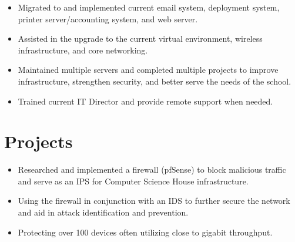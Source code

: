 \documentclass[]{deedy-resume-openfont}
\begin{document}
\begin{minipage}[t]{0.66\textwidth}
\vspace{-3mm}
\begin{itemize}
  \itemsep-4pt
  \item Migrated to and implemented current email system, deployment system, printer server/accounting system, and web server.
  \item Assisted in the upgrade to the current virtual environment, wireless infrastructure, and core networking.
  \item Maintained multiple servers and completed multiple projects to improve infrastructure, strengthen security, and better serve the needs of the school.
  \item Trained current IT Director and provide remote support when needed.
\end{itemize}
\vspace{-4mm}
\sectionsep

\sectionsep

\vspace{-3mm}
\section{Projects}
\vspace{-3mm}
\begin{itemize}
  \itemsep-4pt
  \item Researched and implemented a firewall (pfSense) to block malicious traffic and serve as an IPS for Computer Science House infrastructure.
  \item Using the firewall in conjunction with an IDS to further secure the network and aid in attack identification and prevention.
  \item Protecting over 100 devices often utilizing close to gigabit throughput.
\end{itemize}
\vspace{-4mm}
\sectionsep


\end{minipage}
\end{document}
